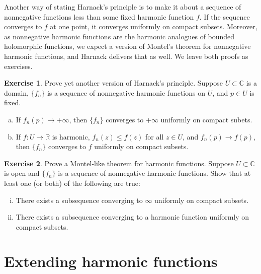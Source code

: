 \documentclass[12pt,openany]{book}
\newcommand{\C}{{\mathbb{C}}}
\newcommand{\R}{{\mathbb{R}}}
\theoremstyle{plain}
\theoremstyle{remark}
\theoremstyle{definition}
\newenvironment{exbox}{%
    \def\FrameCommand{\vrule width 1pt \relax\hspace{10pt}}%
    \MakeFramed{\advance\hsize-\width\FrameRestore}%
}{%
    \endMakeFramed
}
\newenvironment{exparts}{%
    \leavevmode\begin{enumerate}[a),noitemsep,topsep=0pt,parsep=0pt,partopsep=0pt]
}{%
    \end{enumerate}
}
\theoremstyle{exercise}
\newtheorem{exercise}{Exercise}[section]
\theoremstyle{example}
\begin{document}
Another way of stating Harnack's principle is to make it about
a sequence of nonnegative functions less
than some fixed harmonic function $f$.  If the sequence converges to $f$ at
one point, it converges uniformly on compact subsets.  Moreover, as
nonnegative harmonic functions are the harmonic analogues of bounded holomorphic
functions, we expect a version of Montel's theorem for nonnegative harmonic
functions, and Harnack delivers that as well.  We leave both proofs as
exercises.

\begin{exbox}
\begin{exercise}
Prove yet another version of Harnack's principle.
Suppose $U \subset \C$ is a domain,
$\{ f_n \}$ is a sequence of nonnegative harmonic functions on
$U$, and $p \in U$ is fixed.
\begin{exparts}
\item
If $f_n(p) \to +\infty$, then $\{ f_n \}$ converges to $+\infty$ uniformly on
compact subets.
\item
If $f \colon U \to \R$ is harmonic, $f_n(z) \leq f(z)$ for all $z \in U$,
and $f_n(p) \to f(p)$, then $\{ f_n \}$ converges to $f$ uniformly on
compact subsets.
\end{exparts}
\end{exercise}

\begin{exercise}
Prove a Montel-like theorem for harmonic functions.  Suppose $U \subset \C$
is open and $\{ f_n \}$ is a sequence of nonnegative harmonic functions.
Show that at least one (or both) of the following are true:
\begin{enumerate}[(i)]
\item
There exists a subsequence converging to $\infty$ uniformly on compact subsets.
\item
There exists a subsequence converging to a harmonic function
uniformly on compact subsets.
\end{enumerate}
\end{exercise}
\end{exbox}



\section{Extending harmonic functions}
\end{document}
